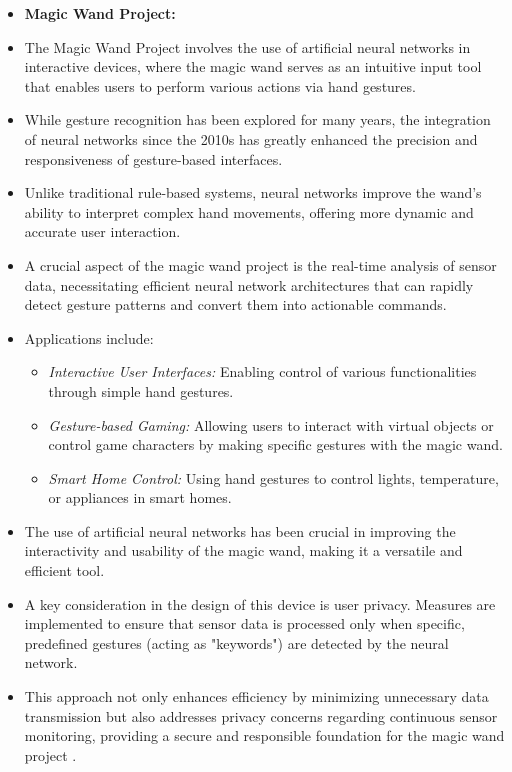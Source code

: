 \begin{itemize}
\item \textbf{Magic Wand Project:}

	\item The Magic Wand Project involves the use of artificial neural networks in interactive devices, where the magic wand serves as an intuitive input tool that enables users to perform various actions via hand gestures.
	\item While gesture recognition has been explored for many years, the integration of neural networks since the 2010s has greatly enhanced the precision and responsiveness of gesture-based interfaces.
	\item Unlike traditional rule-based systems, neural networks improve the wand's ability to interpret complex hand movements, offering more dynamic and accurate user interaction.
	\item A crucial aspect of the magic wand project is the real-time analysis of sensor data, necessitating efficient neural network architectures that can rapidly detect gesture patterns and convert them into actionable commands.
	\item Applications include:
	\begin{itemize}
		\item \textit{Interactive User Interfaces:} Enabling control of various functionalities through simple hand gestures.
		\item \textit{Gesture-based Gaming:} Allowing users to interact with virtual objects or control game characters by making specific gestures with the magic wand.
		\item \textit{Smart Home Control:} Using hand gestures to control lights, temperature, or appliances in smart homes.
	\end{itemize}
	\item The use of artificial neural networks has been crucial in improving the interactivity and usability of the magic wand, making it a versatile and efficient tool.
	\item A key consideration in the design of this device is user privacy. Measures are implemented to ensure that sensor data is processed only when specific, predefined gestures (acting as "keywords") are detected by the neural network.
	\item This approach not only enhances efficiency by minimizing unnecessary data transmission but also addresses privacy concerns regarding continuous sensor monitoring, providing a secure and responsible foundation for the magic wand project \cite{Alushi:2024}.
\end{itemize}


